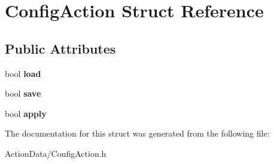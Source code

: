 \hypertarget{struct_config_action}{
\section{\-Config\-Action \-Struct \-Reference}
\label{struct_config_action}
}
\subsection*{\-Public \-Attributes}
\begin{DoxyCompactItemize}
\item 
\hypertarget{struct_config_action_a1b22570c4bb9072709f566bc1af72237}{
bool {\bfseries load}}
\label{struct_config_action_a1b22570c4bb9072709f566bc1af72237}

\item 
\hypertarget{struct_config_action_a91b842c142d9964d3154baa167ecc8e4}{
bool {\bfseries save}}
\label{struct_config_action_a91b842c142d9964d3154baa167ecc8e4}

\item 
\hypertarget{struct_config_action_ade045ecea7182d9fe1f119e95dfc6e48}{
bool {\bfseries apply}}
\label{struct_config_action_ade045ecea7182d9fe1f119e95dfc6e48}

\end{DoxyCompactItemize}


\-The documentation for this struct was generated from the following file\-:\begin{DoxyCompactItemize}
\item 
\-Action\-Data/\-Config\-Action.\-h\end{DoxyCompactItemize}
